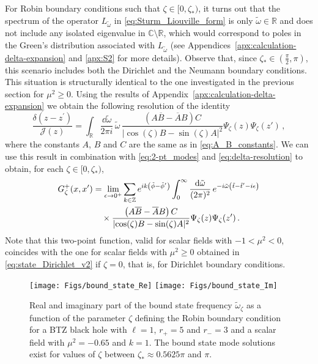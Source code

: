 \documentclass[aps, prd, amsmath, floats, floatfix, twocolumn, nofootinbib, superscriptaddress, showpacs]{revtex4-1}
\def\bC{{\mathbb C}}
\def\bR{{\mathbb R}}
\def\cJ{\mathcal{J}}
\def\tomega{{\tilde{\omega}}}
\begin{document}
For Robin boundary conditions such that $\zeta\in[0,\zeta_*)$, it turns out that the spectrum of the operator $L_\tomega$ in \eqref{eq:Sturm_Liouville_form} is only $\tilde{\omega} \in \bR$ and does not include any isolated eigenvalue in $\bC \setminus \bR$, which would correspond to poles in the Green's distribution associated with $L_\tomega$ (see Appendices~\ref{apx:calculation-delta-expansion} and \ref{apx:S2} for more details). Observe that, since $\zeta_* \in (\frac{\pi}{2}, \pi)$, this scenario includes both the Dirichlet and the Neumann boundary conditions. This situation is structurally identical to the one investigated in the previous section for $\mu^2 \geqslant 0$. Using the results of Appendix~\ref{apx:calculation-delta-expansion} we obtain the following resolution of the identity
%
\begin{equation} \label{eq:identity_resolution}
\frac{\delta(z-z^\prime)}{\cJ(z)} = \int_{\bR} \frac{\dd\tilde{\omega}}{2\pi i} \, \tilde{\omega} \, \frac{\left(A\overline{B}-\overline{A}B\right) C}{|{\cos(\zeta) B-\sin(\zeta)A}|^2} \Psi_{\zeta}(z)\Psi_{\zeta}(z') \, ,
\end{equation}
%
where the constants $A$, $B$ and $C$ are the same as in \eqref{eq:A_B_constants}. We can use this result in combination with \eqref{eq:2-pt_modes} and \eqref{eq:delta-resolution} to obtain, for each $\zeta\in [0,\zeta_*)$,
%
	\begin{align}
	G^+_\zeta(x,x^\prime) &= \lim_{\epsilon \to 0^+} \sum_{k\in\mathbb{Z}} e^{ik\left(\tilde{\phi}-\tilde{\phi}^\prime\right)} \int_0^{\infty} \frac{\dd\tilde{\omega}}{(2\pi)^2} \, e^{-i\tilde{\omega} \left(\tilde{t}-\tilde{t}^\prime-i\epsilon\right)} \notag 
	\\
	&\quad \times \frac{\left(A\overline{B}-\overline{A}B\right) C}{|{\cos(\zeta) B-\sin(\zeta)A}|^2} \Psi_{\zeta}(z)\Psi_{\zeta}(z') \, . \label{eq:state_Robin_no_BS}
	\end{align}
%
Note that this two-point function, valid for scalar fields with $-1<\mu^2<0$, coincides with the one for scalar fields with $\mu^2 \geqslant 0$ obtained in \eqref{eq:state_Dirichlet_v2} if $\zeta=0$, that is, for Dirichlet boundary conditions.
		


%

\begin{figure*}[t!]
	\centering
	\texttt{[image: Figs/bound\_state\_Re]} \hspace{8ex}
	\texttt{[image: Figs/bound\_state\_Im]}
	\caption{\label{fig:bound-state}
	Real and imaginary part of the bound state frequency $\tilde{\omega}_{\zeta}$ as a function of the parameter $\zeta$ defining the Robin boundary condition for a BTZ black hole with $\ell=1$, $r_+=5$ and $r_-=3$ and a scalar field with $\mu^2 = - 0.65$ and $k=1$. The bound state mode solutions exist for values of $\zeta$ between $\zeta_* \approx 0.5625\pi$ and $\pi$.}
\end{figure*}
\end{document}
